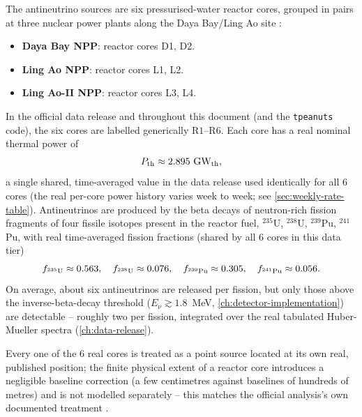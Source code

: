 \begin{theorybox}
The antineutrino sources are six pressurised-water reactor cores, grouped
in pairs at three nuclear power plants along the Daya Bay/Ling Ao
site \parencite{An2017DayaBayFluxSpectrum,DayaBayZenodo2025}:
\begin{itemize}
  \item \textbf{Daya Bay NPP}: reactor cores D1, D2.
  \item \textbf{Ling Ao NPP}: reactor cores L1, L2.
  \item \textbf{Ling Ao-II NPP}: reactor cores L3, L4.
\end{itemize}
In the official data release and throughout this document (and the
\texttt{tpeanuts} code), the six cores are labelled generically
$\mathrm{R1}$--$\mathrm{R6}$. Each core has a real nominal thermal power of
\begin{equation}
  P_{\rm th} \approx 2.895\ \mathrm{GW_{th}},
\end{equation}
a single shared, time-averaged value in the data release used identically
for all 6 cores (the real per-core power history varies week to week; see
\cref{sec:weekly-rate-table}). Antineutrinos are produced by the beta decays
of neutron-rich fission fragments of four fissile isotopes present in the
reactor fuel, $^{235}$U, $^{238}$U, $^{239}$Pu, $^{241}$Pu, with real
time-averaged fission fractions (shared by all 6 cores in this data tier)
\begin{equation}
  f_{^{235}{\rm U}} \approx 0.563,\quad
  f_{^{238}{\rm U}} \approx 0.076,\quad
  f_{^{239}{\rm Pu}} \approx 0.305,\quad
  f_{^{241}{\rm Pu}} \approx 0.056.
\end{equation}
On average, about six antineutrinos are released per fission, but only
those above the inverse-beta-decay threshold ($E_\nu \gtrsim 1.8$~MeV,
\cref{ch:detector-implementation}) are detectable -- roughly two per
fission, integrated over the real tabulated Huber-Mueller spectra
(\cref{ch:data-release}).
\end{theorybox}

\begin{notebox}
Every one of the 6 real cores is treated as a point source located at its
own real, published position; the finite physical extent of a reactor core
introduces a negligible baseline correction (a few centimetres against
baselines of hundreds of metres) and is not modelled separately -- this
matches the official analysis's own documented treatment
\parencite{An2017DayaBayFluxSpectrum}.
\end{notebox}

